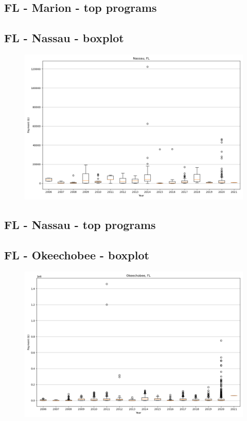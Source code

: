 \subsection*{FL - Marion - top programs}

\newpage
\subsection*{FL - Nassau - boxplot}
\begin{figure}[h]
\centering
\includegraphics[width=7in]{../output/boxplots/counties/Nassau-FL_boxplot.png}
\end{figure}


\subsection*{FL - Nassau - top programs}

\newpage
\subsection*{FL - Okeechobee - boxplot}
\begin{figure}[h]
\centering
\includegraphics[width=7in]{../output/boxplots/counties/Okeechobee-FL_boxplot.png}
\end{figure}


